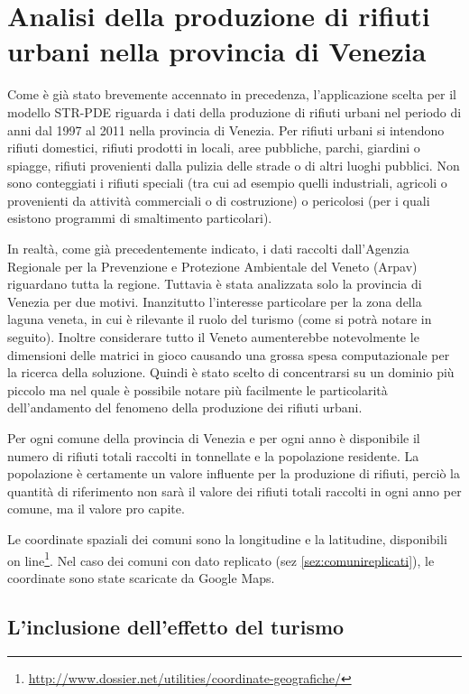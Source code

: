 \documentclass[a4paper,11pt,twoside,openright]{book}							%
\begin{document}
\chapter{Analisi della produzione di rifiuti urbani nella provincia di Venezia}
\label{cap:rifiuti}

Come è già stato brevemente accennato in precedenza, l'applicazione scelta per il modello STR-PDE riguarda i dati della produzione di rifiuti urbani nel periodo di anni dal 1997 al 2011 nella provincia di Venezia. Per rifiuti urbani si intendono rifiuti domestici, rifiuti prodotti in locali, aree pubbliche, parchi, giardini o spiagge, rifiuti provenienti dalla pulizia delle strade o di altri luoghi pubblici. Non sono conteggiati i rifiuti speciali (tra cui ad esempio quelli industriali, agricoli o provenienti da attività commerciali o di costruzione) o pericolosi (per i quali esistono programmi di smaltimento particolari).

In realtà, come già precedentemente indicato, i dati raccolti dall'Agenzia Regionale per la Prevenzione e Protezione Ambientale del Veneto (Arpav) riguardano tutta la regione. Tuttavia è stata analizzata solo la provincia di Venezia per due motivi. Inanzitutto l'interesse particolare per la zona della laguna veneta, in cui è rilevante il ruolo del turismo (come si potrà notare in seguito). Inoltre considerare tutto il Veneto aumenterebbe notevolmente le dimensioni delle matrici in gioco causando una grossa spesa computazionale per la ricerca della soluzione. Quindi è stato scelto di concentrarsi su un dominio più piccolo ma nel quale è possibile notare più facilmente le particolarità dell'andamento del fenomeno della produzione dei rifiuti urbani.

Per ogni comune della provincia di Venezia e per ogni anno è disponibile il numero di rifiuti totali raccolti in tonnellate e la popolazione residente. La popolazione è certamente un valore influente per la produzione di rifiuti, perciò la quantità di riferimento non sarà il valore dei rifiuti totali raccolti in ogni anno per comune, ma il valore pro capite.

Le coordinate spaziali dei comuni sono la longitudine e la latitudine, disponibili on line\footnote{\href{http://www.dossier.net/utilities/coordinate-geografiche/}{http://www.dossier.net/utilities/coordinate-geografiche/}}. Nel caso dei comuni con dato replicato (sez \ref{sez:comunireplicati}), le coordinate sono state scaricate da Google Maps.


\section{L'inclusione dell'effetto del turismo}
\end{document}
